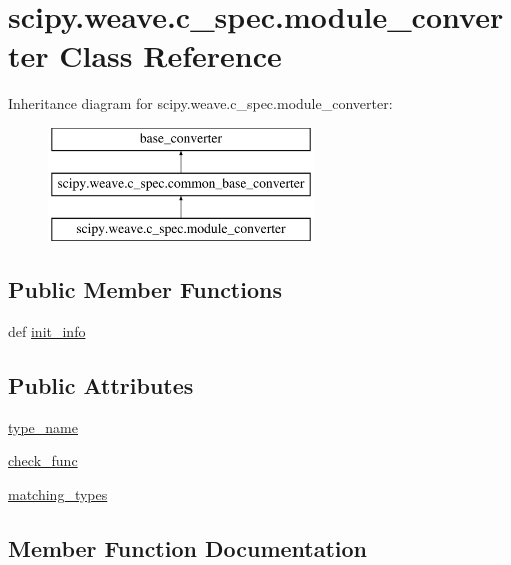 \hypertarget{classscipy_1_1weave_1_1c__spec_1_1module__converter}{}\section{scipy.\+weave.\+c\+\_\+spec.\+module\+\_\+converter Class Reference}
\label{classscipy_1_1weave_1_1c__spec_1_1module__converter}
Inheritance diagram for scipy.\+weave.\+c\+\_\+spec.\+module\+\_\+converter\+:\begin{figure}[H]
\begin{center}
\leavevmode
\includegraphics[height=3.000000cm]{classscipy_1_1weave_1_1c__spec_1_1module__converter}
\end{center}
\end{figure}
\subsection*{Public Member Functions}
\begin{DoxyCompactItemize}
\item 
def \hyperlink{classscipy_1_1weave_1_1c__spec_1_1module__converter_a425eaf19eb511553d54fdb128e38e0f9}{init\+\_\+info}
\end{DoxyCompactItemize}
\subsection*{Public Attributes}
\begin{DoxyCompactItemize}
\item 
\hyperlink{classscipy_1_1weave_1_1c__spec_1_1module__converter_ae1e74061f42f3e9efeb12cca8f68eadd}{type\+\_\+name}
\item 
\hyperlink{classscipy_1_1weave_1_1c__spec_1_1module__converter_a18be81d47ae2b1e5a6335bbffdbbe173}{check\+\_\+func}
\item 
\hyperlink{classscipy_1_1weave_1_1c__spec_1_1module__converter_aa5522f69c3f17f1af40f105f1451a40a}{matching\+\_\+types}
\end{DoxyCompactItemize}


\subsection{Member Function Documentation}
\hypertarget{classscipy_1_1weave_1_1c__spec_1_1module__converter_a425eaf19eb511553d54fdb128e38e0f9}{}
